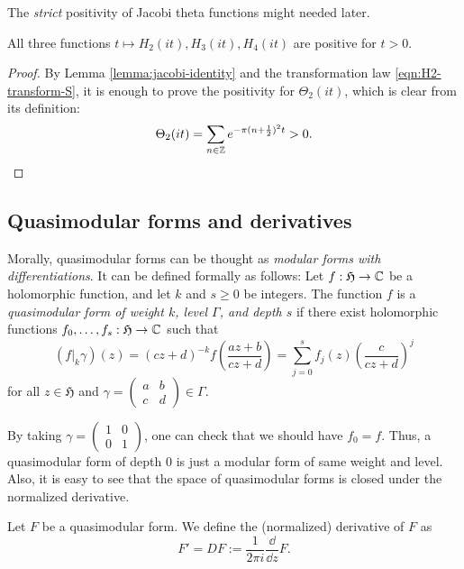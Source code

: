 The \emph{strict} positivity of Jacobi theta functions might needed later.
\begin{corollary}\label{cor:theta-pos}
All three functions $t \mapsto H_2(it), H_3(it), H_4(it)$ are positive for $t > 0$.
\end{corollary}
\begin{proof}
By Lemma \ref{lemma:jacobi-identity} and the transformation law \eqref{eqn:H2-transform-S}, it is enough to prove the positivity for $\Theta_2(it)$, which is clear from its definition:
\begin{equation}
    \Theta_{2}(it) = \sum_{n \in \mathbb{Z}} e^{- \pi (n + \frac{1}{2})^{2} t} > 0.
\end{equation}
\end{proof}

\subsection{Quasimodular forms and derivatives}

Morally, quasimodular forms can be thought as \emph{modular forms with differentiations}.
It can be defined formally as follows:
Let $f: \mathfrak{H} \to \mathbb{C}$ be a holomorphic function, and let $k$ and $s \ge 0$ be integers.
The function $f$ is a \emph{quasimodular form of weight $k$, level $\Gamma$, and depth $s$} if there exist holomorphic functions $f_0, \dots, f_s : \mathfrak{H} \to \mathbb{C}$ such that
\begin{equation}\label{eqn:quasimod-def}
    (f|_{k}\gamma)(z) = (cz + d)^{-k} f\left(\frac{az + b}{cz + d}\right) = \sum_{j=0}^{s} f_j(z) \left(\frac{c}{cz + d}\right)^j
\end{equation}
for all $z \in \mathfrak{H}$ and $\gamma = \left(\begin{smallmatrix} a&b\\c&d \end{smallmatrix}\right) \in \Gamma$.

By taking $\gamma = \left(\begin{smallmatrix} 1 & 0 \\ 0 & 1 \end{smallmatrix}\right)$, one can check that we should have $f_0 = f$. Thus, a quasimodular form of depth $0$ is just a modular form of same weight and level.
Also, it is easy to see that the space of quasimodular forms is closed under the normalized derivative.
\begin{definition}\label{def:derivative}
Let $F$ be a quasimodular form.
We define the (normalized) derivative of $F$ as
\begin{equation}\label{eqn:derivative}
    F' = DF := \frac{1}{2\pi i} \frac{\dd}{\dd z} F.
\end{equation}
\end{definition}

